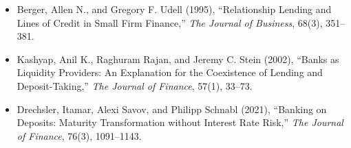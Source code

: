 
\begin{itemize}

\item Berger, Allen N., and Gregory F. Udell (1995),
``Relationship Lending and Lines of Credit in Small Firm Finance,''
\emph{The Journal of Business}, 68(3), 351--381.

\item Kashyap, Anil K., Raghuram Rajan, and Jeremy C. Stein (2002),
``Banks as Liquidity Providers: An Explanation for the Coexistence of Lending and Deposit-Taking,''
\emph{The Journal of Finance}, 57(1), 33--73.

\item Drechsler, Itamar, Alexi Savov, and Philipp Schnabl (2021),
``Banking on Deposits: Maturity Transformation without Interest Rate Risk,''
\emph{The Journal of Finance}, 76(3), 1091--1143.

\end{itemize}

